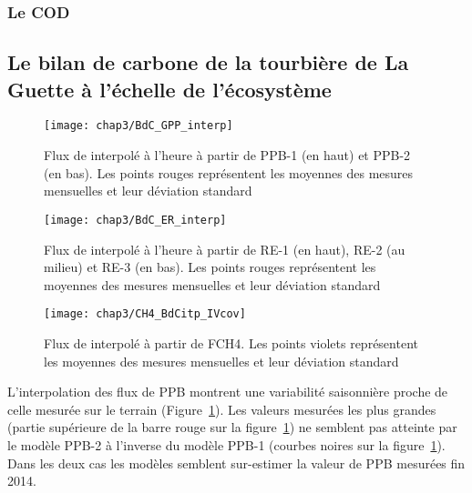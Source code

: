\subsubsection{Le COD}


\subsection{Le bilan de carbone de la tourbière de La Guette à l'échelle de l'écosystème}


\begin{figure}
\centering
\texttt{[image: chap3/BdC\_GPP\_interp]}
\caption{Flux de \coo interpolé à l'heure à partir de PPB-1 (en haut) et PPB-2 (en bas). Les points rouges représentent les moyennes des mesures mensuelles et leur déviation standard}
\label{fig:BdC_GPP_interp}
\end{figure}

\begin{figure}
\centering
\texttt{[image: chap3/BdC\_ER\_interp]}
\caption{Flux de \coo interpolé à l'heure à partir de RE-1 (en haut), RE-2 (au milieu) et RE-3 (en bas). Les points rouges représentent les moyennes des mesures mensuelles et leur déviation standard}
\label{fig:BdC_ER_interp}
\end{figure}

\begin{figure}
\centering
\texttt{[image: chap3/CH4\_BdCitp\_IVcov]}
\caption{Flux de \coo interpolé à partir de FCH4. Les points violets représentent les moyennes des mesures mensuelles et leur déviation standard}
\label{fig:BdC_CH4_interp}
\end{figure}



L'interpolation des flux de PPB montrent une variabilité saisonnière proche de celle mesurée sur le terrain (Figure~\ref{fig:BdC_GPP_interp}). 
Les valeurs mesurées les plus grandes (partie supérieure de la barre rouge sur la figure~\ref{fig:BdC_GPP_interp}) ne semblent pas atteinte par le modèle PPB-2 à l'inverse du modèle PPB-1 (courbes noires sur la figure~\ref{fig:BdC_GPP_interp}).
Dans les deux cas les modèles semblent sur-estimer la valeur de PPB mesurées fin 2014.


